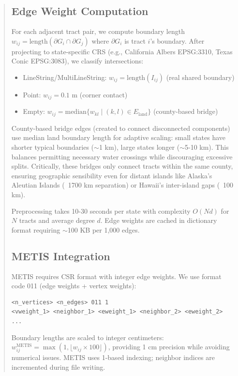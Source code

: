 \documentclass[11pt,twocolumn]{article}
\begin{document}
\begin{abstract}
\subsection{Edge Weight Computation}\label{sec:edge-weights}

For each adjacent tract pair, we compute boundary length $w_{ij} = \text{length}(\partial G_i \cap \partial G_j)$ where $\partial G_i$ is tract $i$'s boundary. After projecting to state-specific CRS (e.g., California Albers EPSG:3310, Texas Conic EPSG:3083), we classify intersections:
\begin{itemize}
\item LineString/MultiLineString: $w_{ij} = \text{length}(I_{ij})$ (real shared boundary)
\item Point: $w_{ij} = 0.1$ m (corner contact)
\item Empty: $w_{ij} = \text{median}\{w_{kl} \mid (k,l) \in E_{\text{land}}\}$ (county-based bridge)
\end{itemize}

County-based bridge edges (created to connect disconnected components) use median land boundary length for adaptive scaling: small states have shorter typical boundaries ($\sim$1 km), large states longer ($\sim$5-10 km). This balances permitting necessary water crossings while discouraging excessive splits. Critically, these bridges only connect tracts within the same county, ensuring geographic sensibility even for distant islands like Alaska's Aleutian Islands (~1700 km separation) or Hawaii's inter-island gaps (~100 km).

Preprocessing takes 10-30 seconds per state with complexity $O(Nd)$ for $N$ tracts and average degree $d$. Edge weights are cached in dictionary format requiring $\sim$100 KB per 1,000 edges.

\subsection{METIS Integration}

METIS requires CSR format with integer edge weights. We use format code 011 (edge weights + vertex weights):

\begin{verbatim}
<n_vertices> <n_edges> 011 1
<vweight_1> <neighbor_1> <eweight_1> <neighbor_2> <eweight_2> ...
\end{verbatim}

Boundary lengths are scaled to integer centimeters: $w_{ij}^{\text{METIS}} = \max(1, \lfloor w_{ij} \times 100 \rfloor)$, providing 1 cm precision while avoiding numerical issues. METIS uses 1-based indexing; neighbor indices are incremented during file writing.


\end{abstract}
\end{document}
